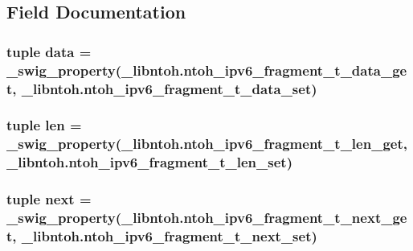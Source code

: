 \subsection{Field Documentation}
\hypertarget{classlibntoh_1_1ntoh__ipv6__fragment__t_aa7a0efb8690a34f61a95b00cc723ca27}{
\subsubsection[{data}]{\setlength{\rightskip}{0pt plus 5cm}tuple data = {\bf \-\_\-swig\-\_\-property}(\-\_\-libntoh.\-ntoh\-\_\-ipv6\-\_\-fragment\-\_\-t\-\_\-data\-\_\-get, \-\_\-libntoh.\-ntoh\-\_\-ipv6\-\_\-fragment\-\_\-t\-\_\-data\-\_\-set)\hspace{0.3cm}{\ttfamily [static]}}}\label{classlibntoh_1_1ntoh__ipv6__fragment__t_aa7a0efb8690a34f61a95b00cc723ca27}
\hypertarget{classlibntoh_1_1ntoh__ipv6__fragment__t_af8e41b97a0d8adea11037648944de58f}{
\subsubsection[{len}]{\setlength{\rightskip}{0pt plus 5cm}tuple len = {\bf \-\_\-swig\-\_\-property}(\-\_\-libntoh.\-ntoh\-\_\-ipv6\-\_\-fragment\-\_\-t\-\_\-len\-\_\-get, \-\_\-libntoh.\-ntoh\-\_\-ipv6\-\_\-fragment\-\_\-t\-\_\-len\-\_\-set)\hspace{0.3cm}{\ttfamily [static]}}}\label{classlibntoh_1_1ntoh__ipv6__fragment__t_af8e41b97a0d8adea11037648944de58f}
\hypertarget{classlibntoh_1_1ntoh__ipv6__fragment__t_a84e6dac37062f5a539ece8248c8567cc}{
\subsubsection[{next}]{\setlength{\rightskip}{0pt plus 5cm}tuple next = {\bf \-\_\-swig\-\_\-property}(\-\_\-libntoh.\-ntoh\-\_\-ipv6\-\_\-fragment\-\_\-t\-\_\-next\-\_\-get, \-\_\-libntoh.\-ntoh\-\_\-ipv6\-\_\-fragment\-\_\-t\-\_\-next\-\_\-set)\hspace{0.3cm}{\ttfamily [static]}}}\label{classlibntoh_1_1ntoh__ipv6__fragment__t_a84e6dac37062f5a539ece8248c8567cc}
